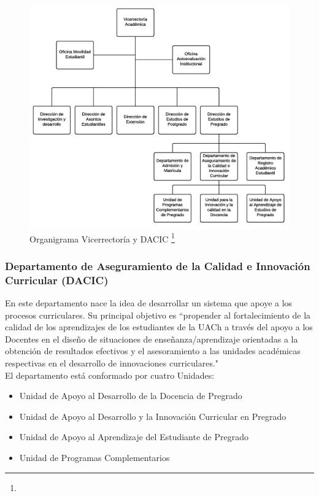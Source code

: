 		\begin{figure}[h]
			\centering
			\includegraphics[width=1\textwidth]{images/Capitulo_1/Organigrama.png}
			\caption[Organigrama Vicerrectoría y DACIC]{Organigrama Vicerrectoría y DACIC \footnote{}}
			\label{Figura1}
		\end{figure}
		
		\subsubsection{Departamento de Aseguramiento de la Calidad e Innovación Curricular (DACIC)}
		
		
		En este departamento nace la idea de desarrollar un sistema que apoye a los procesos curriculares. Su principal objetivo es ``propender al fortalecimiento de la calidad de los aprendizajes de los estudiantes de la UACh a través del apoyo a los  Docentes en el diseño de situaciones de enseñanza/aprendizaje orientadas a la obtención de resultados efectivos y el asesoramiento a las unidades académicas respectivas en el desarrollo de innovaciones curriculares."\hspace{0.2cm} \cite{Dac15}
		\\
		
		El departamento está conformado por cuatro Unidades:
			\begin{itemize}
				\item Unidad de Apoyo al Desarrollo de la Docencia de Pregrado
				\item Unidad de Apoyo al Desarrollo y la Innovación Curricular en Pregrado
				\item Unidad de Apoyo al Aprendizaje del Estudiante de Pregrado 	
				\item  Unidad de Programas Complementarios
			\end{itemize}
		
